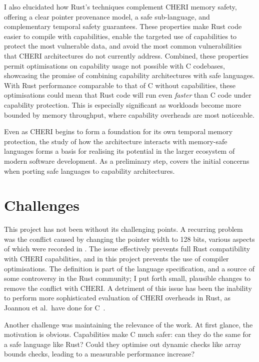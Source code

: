 \documentclass[dissertation.tex]{subfiles}
\begin{document}
I also elucidated how Rust's techniques complement CHERI memory safety,
offering a clear pointer provenance model, a safe sub-language, and
complementary temporal safety guarantees.
These properties make Rust code easier to compile with capabilities,
enable the targeted use of capabilities to protect the most vulnerable
data, and avoid the most common vulnerabilities that
CHERI architectures do not currently address.
Combined, these properties permit optimisations on capability usage not
possible with C codebases, showcasing the promise of combining
capability architectures with safe languages.
With Rust performance comparable to that of C without capabilities,
these optimisations could mean that Rust code will run even \emph{faster}
than C code under capability protection.
This is especially significant as workloads become more bounded by memory
throughput, where capability overheads are most noticeable.

Even as CHERI begins to form a foundation for its own temporal memory
protection, the study of how the architecture interacts with memory-safe
languages forms a basis for realising its potential in the larger
ecosystem of modern software development.
As a preliminary step,  covers the initial
concerns when porting safe languages to capability architectures.


\section{Challenges}

This project has not been without its challenging points.
A recurring problem was the conflict caused by changing the pointer
width to 128 bits, various aspects of which were recorded in
.
The issue effectively prevents full Rust compatibility with CHERI
capabilities, and in this project prevents the use of compiler
optimisations.
The definition is part of the language specification, and a source of
some controversy in the Rust community; I put forth small, plausible
changes to remove the conflict with CHERI.
A detriment of this issue has been the inability to perform more
sophisticated evaluation of CHERI overheads in Rust, as Joannou et al.\
have done for C~\cite{cheri-tagged-memory}.

Another challenge was maintaining the relevance of the work.
At first glance, the motivation is obvious.
Capabilities make C much safer: can they do the same for a safe language
like Rust?
Could they optimise out dynamic checks like array bounds checks, leading
to a measurable performance increase?
\end{document}
